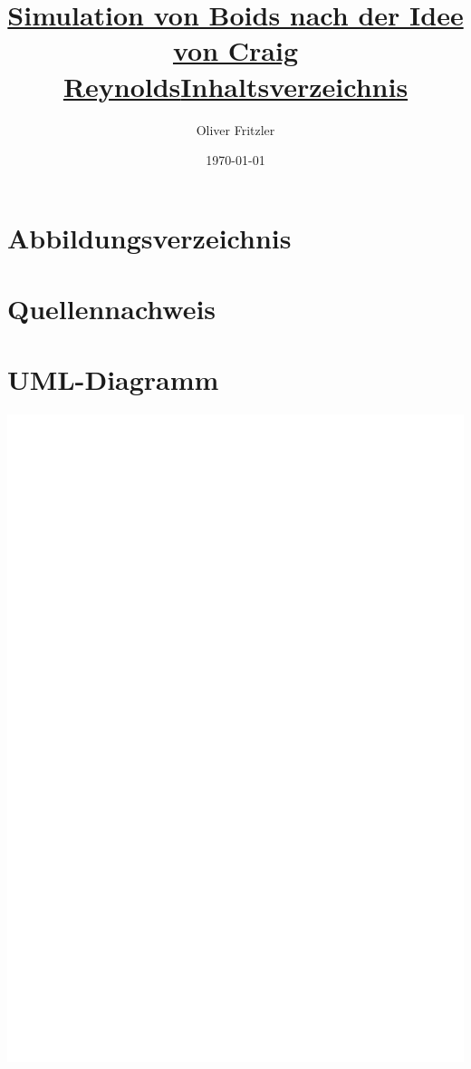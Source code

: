 \documentclass[a4paper, 12pt]{article}
\begin{document}
	\begin{titlepage}
		\title{\Large{\textbf{\underline{Simulation von Boids nach der Idee von Craig Reynolds}}}}
		\author{Oliver Fritzler}
		\date{\today}
		\maketitle
	\end{titlepage}
	\title{\Large{\textbf{\underline{Inhaltsverzeichnis}}}}
	\tableofcontents
	\newpage
	\section{Abbildungsverzeichnis}
	\newpage
	\section{Quellennachweis}
	\newpage
	\section{UML-Diagramm}
	\includegraphics[scale=0.75, page=1]{UML/Boids_UML.pdf}
	\newpage
\end{document}

